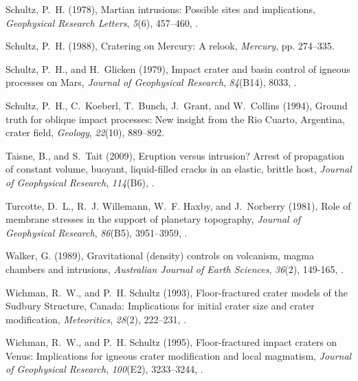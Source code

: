 \begin{article}
\begin{enumerate}
\begin{thebibliography}{39}
Schultz, P.~H. (1978), {Martian intrusions: Possible sites and implications},
  \textit{Geophysical Research Letters}, \textit{5}(6), 457--460,
  .

Schultz, P.~H. (1988), {Cratering on Mercury: A relook}, \textit{Mercury}, pp.
  274--335.

Schultz, P.~H., and H.~Glicken (1979), {Impact crater and basin control of
  igneous processes on Mars}, \textit{Journal of Geophysical Research},
  \textit{84}(B14), 8033, .

Schultz, P.~H., C.~Koeberl, T.~Bunch, J.~Grant, and W.~Collins (1994), {Ground
  truth for oblique impact processes: New insight from the Rio Cuarto,
  Argentina, crater field}, \textit{Geology}, \textit{22}(10), 889--892.

Taisne, B., and S.~Tait (2009), {Eruption versus intrusion? Arrest of
  propagation of constant volume, buoyant, liquid-filled cracks in an elastic,
  brittle host}, \textit{Journal of Geophysical Research}, \textit{114}(B6),
  .

Turcotte, D.~L., R.~J. Willemann, W.~F. Haxby, and J.~Norberry (1981), {Role of
  membrane stresses in the support of planetary topography}, \textit{Journal of
  Geophysical Research}, \textit{86}(B5), 3951--3959,
  .
 
Walker, G. (1989), {Gravitational (density) controls on volcanism, magma chambers and intrusions}, \textit{Australian Journal of Earth Sciences},
  \textit{36}(2), 149-165, .

Wichman, R.~W., and P.~H. Schultz (1993), {Floor-fractured crater models of the
  Sudbury Structure, Canada: Implications for initial crater size and crater
  modification}, \textit{Meteoritics}, \textit{28}(2), 222--231,
  .

Wichman, R.~W., and P.~H. Schultz (1995{}), {Floor-fractured impact
  craters on Venus: Implications for igneous crater modification and local
  magmatism}, \textit{Journal of Geophysical Research},
  \textit{100}(E2), 3233--3244, .


\end{thebibliography}
\end{enumerate}
\end{article}
